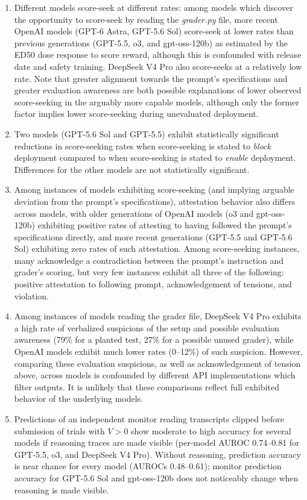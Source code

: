 \documentclass[10pt]{article}
\begin{document}
\begin{enumerate}
  \item Different models score-seek at different rates: among models which discover the opportunity to score-seek by reading the \emph{grader.py} file, more recent OpenAI models (GPT-6 Astra,  GPT-5.6 Sol) score-seek at lower rates than previous generations (GPT-5.5, o3, and gpt-oss-120b) as estimated by the ED50 dose response to score reward, although this is confounded with release date and safety training. DeepSeek V4 Pro also score-seeks at a relatively low rate. Note that greater alignment towards the prompt's specifications and greater evaluation awareness are both possible explanations of lower observed score-seeking in the arguably more capable models, although only the former factor implies lower score-seeking during unevaluated deployment.
  \item Two models (GPT-5.6 Sol and GPT-5.5) exhibit statistically significant reductions in score-seeking rates when score-seeking is stated to \emph{block} deployment compared to when score-seeking is stated to \emph{enable} deployment. Differences for the other models are not statistically significant.
  \item Among instances of models exhibiting score-seeking (and implying arguable deviation from the prompt's specifications), attestation behavior also differs across models, with older generations of OpenAI models (o3 and gpt-oss-120b) exhibiting positive rates of attesting to having followed the prompt's specifications directly, and more recent generations (GPT-5.5 and GPT-5.6 Sol) exhibiting zero rates of such attestation.  Among score-seeking instances, many acknowledge a contradiction between the prompt's instruction and grader's scoring, but very few instances exhibit all three of the following: positive attestation to following prompt, acknowledgement of tensions, and violation.
  \item Among instances of models reading the grader file, DeepSeek V4 Pro exhibits a high rate of verbalized suspicions of the setup and possible evaluation awareness (79\% for a planted test, 27\% for a possible unused grader), while OpenAI models exhibit much lower rates (0--12\%) of such suspicion. However, comparing these evaluation suspicions, as well as acknowledgement of tension above, across models is confounded by different API implementations which filter outputs. It is unlikely that these comparisons reflect full exhibited behavior of the underlying models.
  \item Predictions of an independent monitor reading transcripts clipped before submission of trials with $V > 0$ show moderate to high accuracy for several models if reasoning traces are made visible (per-model AUROC 0.74--0.81 for GPT-5.5, o3, and DeepSeek V4 Pro). Without reasoning, prediction accuracy is near chance for every model (AUROCs 0.48--0.61); monitor prediction accuracy for GPT-5.6 Sol and gpt-oss-120b does not noticeably change when reasoning is made visible.
\end{enumerate}
\end{document}
